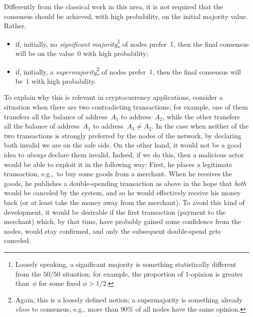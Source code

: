 \documentclass[../main.tex]{subfiles}
\begin{document}
Differently from the classical work
in this area, 
it is not required that
the consensus should be achieved, with high probability, on the initial majority
value.
Rather, 
\begin{itemize}
 \item if, initially, no 
 \emph{significant majority}\footnote{Loosely speaking,
 a significant majority is something statistically 
 different from the $50/50$ situation; for example,
 the proportion of $1$-opinion is greater than~$\phi$
 for some fixed $\phi>1/2$.} 
 of nodes prefer~$1$,
 then the final consensus will be on the value~$0$ 
with high probability;
 \item if, initially, a 
 \emph{supermajority}\footnote{Again, this is 
 a loosely defined notion; 
 a supermajority is something already \emph{close}
 to consensus, e.g., more than 90\% of all nodes 
 have the same opinion.}
 of nodes prefer~$1$,
 then the final consensus will be~$1$ with high probability.
\end{itemize}
To explain why this is relevant in cryptocurrency 
applications, consider a situation when there 
are two contradicting transactions;
for example, one of them transfers all the balance of 
address~$A_1$ to address~$A_2$, while the other
transfers all the balance of 
address~$A_1$ to address~$A_3\neq A_2$.
In the case when neither of the two transactions
is strongly preferred by the nodes of the network,
by declaring both invalid we are on the safe side.
On the other hand, it would not be a good idea to \emph{always}
declare them invalid. Indeed, if we do this, 
then a malicious actor would be able to 
exploit it in the following
way: First, he places a legitimate transaction, e.g.,\
to buy some goods from a merchant. When he receives 
the goods, he publishes a double-spending transaction
as above in the hope that \emph{both} would be
canceled by the system, and so he would effectively
receive his money back (or at least take
the money away from the merchant). To avoid this kind
of development, it would be desirable if the first
transaction (payment to the merchant) which,
by that time, have probably gained some confidence 
 from the nodes, would stay confirmed,
and only the subsequent double-spend gets canceled.
\end{document}
